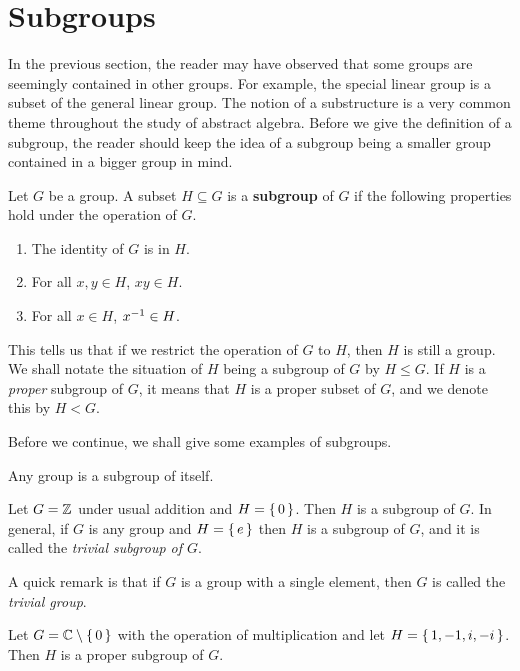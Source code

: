 \documentclass[./main.tex]{subfiles}
\begin{document}
\pagebreak
\section{Subgroups}
In the previous section, the reader may have observed that some groups are
seemingly contained in other groups. For example, the special linear group is a
subset of the general linear group. The notion of a substructure is a very
common theme throughout the study of abstract algebra. Before we give the
definition of a subgroup, the reader should keep the idea of a subgroup being a
smaller group contained in a bigger group in mind.

\begin{definition}[Subgroup]
\label{def:subgroup}
    Let $G$ be a group. A subset $H \subseteq G$ is a \textbf{subgroup} of $G$
    if the following properties hold under the operation of $G$.
    \begin{enumerate}
        \item The identity of $G$ is in $H$.
        \item For all $x, y \in H$, $xy \in H$.
        \item For all $x \in H$, $x ^{-1} \in H$.
    \end{enumerate}
\end{definition}
This tells us that if we restrict the operation of $G$ to $H$, then $H$ is still
a group. We shall notate the situation of $H$ being a subgroup of $G$ by $H \leq
G$. If $H$ is a \emph{proper} subgroup of $G$, it means that $H$ is a proper
subset of $G$, and we denote this by $H < G$.

Before we continue, we shall give some examples of subgroups.

\begin{example}
    Any group is a subgroup of itself.
\end{example}

\begin{example}
    Let $G = \mathbb{Z}$ under usual addition and $H = \set{0}$. Then $H$ is a subgroup of
    $G$. In general, if $G$ is any group and $H = \set{e}$ then $H$ is a
    subgroup of $G$, and it is called the \emph{trivial subgroup of $G$}. 
\end{example}
A quick remark is that if $G$ is a group with a single element, then $G$ is
called the \emph{trivial group}.

\begin{example}
    Let $G = \mathbb{C} \setminus \set{0}$ with the operation of multiplication and let
    $H = \set{1, -1, i, -i}$. Then $H$ is a proper subgroup of $G$.
\end{example}
\end{document}

